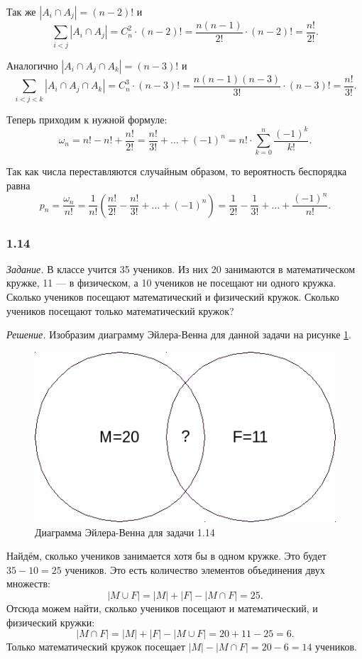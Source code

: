 \documentclass{book}
\begin{document}
Так же $ |A_i \cap A_j| = \left( n-2 \right)!$ и
$$ \sum \limits_{i<j} |A_i \cap A_j| = C_n^2 \cdot \left( n-2 \right)! = \frac{n \left( n-1 \right)}{2!} \cdot \left( n-2 \right)! = \frac{n!}{2!}.$$

Аналогично $ |A_i \cap A_j \cap A_k| = \left( n-3 \right)!$ и
$$ \sum \limits_{i<j<k} |A_i \cap A_j \cap A_k| =
C_n^3 \cdot \left( n-3 \right)! =
\frac{n \left( n-1 \right) \left( n-3 \right) }{3!} \cdot \left( n-3 \right)! =
\frac{n!}{3!}.$$

Теперь приходим к нужной формуле:
$$ \omega_n =
n! - n! + \frac{n!}{2!} =
\frac{n!}{3!} + \dotsc + \left( -1 \right)^n =
n! \cdot \sum \limits_{k=0}^n \frac{ \left( -1 \right)^k }{k!}.$$

Так как числа переставляются случайным образом, то вероятность беспорядка равна
$$ p_n =
\frac{ \omega_n }{n!} =
\frac{1}{n!} \left( \frac{n!}{2!} - \frac{n!}{3!} + \dotsc + \left( -1 \right)^n \right) =
\frac{1}{2!} - \frac{1}{3!} + \dotsc + \frac{ \left( -1 \right)^n}{n!}.$$

\subsubsection*{1.14}

\textit{Задание.} В классе учится 35 учеников.
Из них 20 занимаются в математическом кружке, 11 --- в физическом, а 10 учеников не посещают ни одного кружка.
Сколько учеников посещают математический и физический кружок.
Сколько учеников посещают только математический кружок?

\textit{Решение.} Изобразим диаграмму Эйлера-Венна для данной задачи на рисунке \ref{fig:114}. 

\begin{figure}[h!]
  \centering
  \includegraphics[width=.4\textwidth]{./pictures/1_14.png}
  \caption{Диаграмма Эйлера-Венна для задачи 1.14}
  \label{fig:114}
\end{figure}

Найдём, сколько учеников занимается хотя бы в одном кружке.
Это будет $35-10=25$ учеников.
Это есть количество элементов объединения двух множеств:
$$ |M \cup F| =
|M| + |F| - |M \cap F| =
25.$$
Отсюда можем найти, сколько учеников посещают и математический, и физический кружки:
$$ |M \cap F| =
|M| + |F| - |M \cup F| =
20 + 11 - 25 = 6.$$
Только математический кружок посещает $ |M| - |M \cap F| = 20 - 6 = 14$ учеников.
\end{document}
